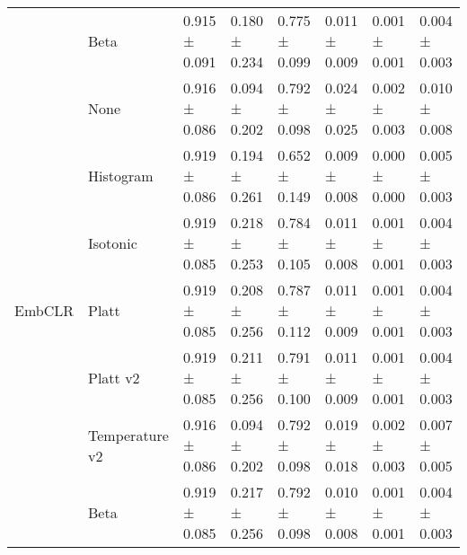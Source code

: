 \begin{tabular}{llllllll}
 & Beta & 0.915 ± 0.091 & 0.180 ± 0.234 & 0.775 ± 0.099 & 0.011 ± 0.009 & 0.001 ± 0.001 & 0.004 ± 0.003 \\
\cline{1-8}
\multirow[t]{7}{*}{EmbCLR} & None & 0.916 ± 0.086 & 0.094 ± 0.202 & 0.792 ± 0.098 & 0.024 ± 0.025 & 0.002 ± 0.003 & 0.010 ± 0.008 \\
 & Histogram & 0.919 ± 0.086 & 0.194 ± 0.261 & 0.652 ± 0.149 & 0.009 ± 0.008 & 0.000 ± 0.000 & 0.005 ± 0.003 \\
 & Isotonic & 0.919 ± 0.085 & 0.218 ± 0.253 & 0.784 ± 0.105 & 0.011 ± 0.008 & 0.001 ± 0.001 & 0.004 ± 0.003 \\
 & Platt & 0.919 ± 0.085 & 0.208 ± 0.256 & 0.787 ± 0.112 & 0.011 ± 0.009 & 0.001 ± 0.001 & 0.004 ± 0.003 \\
 & Platt v2 & 0.919 ± 0.085 & 0.211 ± 0.256 & 0.791 ± 0.100 & 0.011 ± 0.009 & 0.001 ± 0.001 & 0.004 ± 0.003 \\
 & Temperature v2 & 0.916 ± 0.086 & 0.094 ± 0.202 & 0.792 ± 0.098 & 0.019 ± 0.018 & 0.002 ± 0.003 & 0.007 ± 0.005 \\
 & Beta & 0.919 ± 0.085 & 0.217 ± 0.256 & 0.792 ± 0.098 & 0.010 ± 0.008 & 0.001 ± 0.001 & 0.004 ± 0.003 \\
\cline{1-8}
\bottomrule
\end{tabular}

